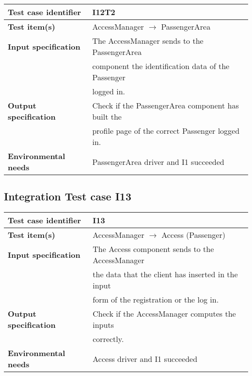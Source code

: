 		\vspace{1cm}
		\noindent
		\begin{adjustbox}{max width=\textwidth}
			\begin{tabular}{ l l}
				\hline 		\textbf{Test case identifier} & I12T2 \\
				\hline		\textbf{Test item(s)}  & AccessManager $\rightarrow$ PassengerArea \\
				\hline		\textbf{Input specification} &  The AccessManager sends to the PassengerArea\\ & component the identification data of the Passenger\\ & logged in.\\
				\hline		\textbf{Output specification} & Check if the PassengerArea component has built the\\ & profile page of the correct Passenger logged in.\\
				\hline		\textbf{Environmental needs} & PassengerArea driver and I1 succeeded\\
				\hline
			\end{tabular}
		\end{adjustbox}
	
	\hypertarget{chapter 3.13}{ }
	\subsection{Integration Test case I13}
		\begin{adjustbox}{max width=\textwidth}
			\begin{tabular}{ l l}
				\hline 		\textbf{Test case identifier} & I13 \\
				\hline		\textbf{Test item(s)}  & AccessManager $\rightarrow$ Access (Passenger) \\
				\hline		\textbf{Input specification} & The Access component sends to the AccessManager \\ & the data that the client has inserted in the input \\ & form of  the registration or the log in.\\
				\hline		\textbf{Output specification} & Check if the AccessManager computes the inputs\\ & correctly.\\
				\hline		\textbf{Environmental needs} & Access driver and I1 succeeded\\
				\hline
			\end{tabular}
		\end{adjustbox}
	
